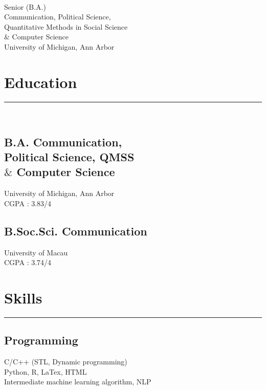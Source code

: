 \documentclass[]{rahulworld-resume}
\begin{document}
%
%

\begin{minipage}[t]{0.33\textwidth} 
\begin{large}
	\\
\end{large}
Senior (B.A.)\\
Communication, Political Science, \\ Quantitative Methods in Social Science \\$\&$ Computer Science\\ 
University of Michigan, Ann Arbor \\ 
\section{Education} 
\noindent\rule{5cm}{0.4pt}\\
\subsection{B.A. Communication, \\Political Science, QMSS \\$\&$ Computer Science}
University of Michigan, Ann Arbor\\
CGPA : 3.83/4\\
\vspace{8pt}
\subsection {B.Soc.Sci. Communication}
University of Macau\\
CGPA : 3.74/4\\
\sectionsep
\section{Skills}
\noindent\rule{5cm}{0.4pt}
\subsection{Programming}
C/C++ (STL, Dynamic programming)\\
Python, R, LaTex, HTML\\
Intermediate machine learning algorithm, NLP
\vspace{6pt}

\end{minipage}
\end{document}
